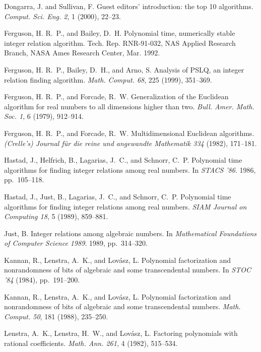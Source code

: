 \documentclass{sig-alternate}
\numberwithin{theorem}{section} \numberwithin{equation}{section}
\begin{document}
\begin{thebibliography}{10}
{\sc Dongarra, J. and Sullivan, F.}
 Guest editors' introduction: the top 10 algorithms.
  {\em Comput. Sci. Eng. 2}, 1 (2000), 22--23.

{\sc Ferguson, H. R.~P., and Bailey, D.~H.}
  Polynomial time, numerically stable integer relation algorithm.
  Tech. Rep. RNR-91-032, NAS Applied Research Branch, NASA Ames
  Research Center, Mar. 1992.

{\sc Ferguson, H. R.~P., Bailey, D.~H., and Arno, S.}
  Analysis of PSLQ, an integer relation finding algorithm.
  {\em Math. Comput. 68}, 225 (1999), 351--369.

{\sc Ferguson, H. R.~P., and Forcade, R.~W.}
  Generalization of the Euclidean algorithm for real numbers to all
  dimensions higher than two.
  {\em Bull. Amer. Math. Soc. 1}, 6 (1979),
  912--914.

{\sc Ferguson, H. R.~P., and Forcade, R.~W.}
  Multidimensional Euclidean algorithms.
  {\em (Crelle's) Journal f{\"u}r die reine und angewandte Mathematik
  334\/} (1982), 171--181.

{\sc Hastad, J., Helfrich, B., Lagarias, J.~C., and Schnorr, C.~P.}
  Polynomial time algorithms for finding integer relations among real
  numbers.
  In {\em STACS '86}. 1986, pp.~105--118.

{\sc Hastad, J., Just, B., Lagarias, J.~C., and Schnorr, C.~P.}
  Polynomial time algorithms for finding integer relations among real
  numbers.
  {\em SIAM Journal on Computing 18}, 5 (1989), 859--881.

{\sc Just, B.}
  Integer relations among algebraic numbers.
  In {\em Mathematical Foundations of Computer Science 1989}. 1989,
  pp.~314--320.

{\sc Kannan, R., Lenstra, A.~K., and Lov\'{a}sz, L.}
  Polynomial factorization and nonrandomness of bits of algebraic and
  some transcendental numbers.
  In {\em STOC '84\/} (1984), pp.~191--200.

{\sc Kannan, R., Lenstra, A.~K., and Lov{\'a}sz, L.}
  Polynomial factorization and nonrandomness of bits of algebraic and
  some transcendental numbers.
  {\em Math. Comput. 50}, 181 (1988), 235--250.

{\sc Lenstra, A.~K., Lenstra, H.~W., and Lov{\'a}sz, L.}
  Factoring polynomials with rational coefficients.
  {\em Math. Ann. 261}, 4 (1982), 515--534.


\end{thebibliography}
\end{document}
